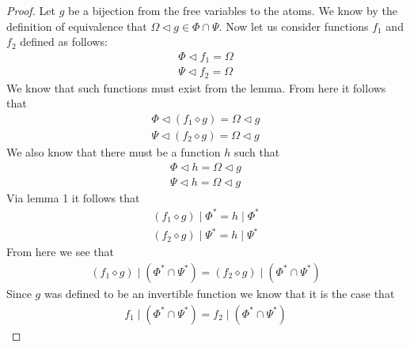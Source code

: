 \documentclass{article}
\begin{document}
\begin{proof}
Let $g$ be a bijection from the free variables to the atoms.
We know by the definition of equivalence that $\Omega \lhd g \in \Phi \cap \Psi$.
Now let us consider functions $f_1$ and $f_2$ defined as follows:
\begin{align*}
\Phi \lhd f_1 = \Omega \\
\Psi \lhd f_2 = \Omega
\end{align*}
We know that such functions must exist from the lemma.
From here it follows that
\begin{align*}
\Phi \lhd (f_1 \diamond g) = \Omega \lhd g \\
\Psi \lhd (f_2 \diamond g) = \Omega \lhd g
\end{align*}
We also know that there must be a function $h$ such that
\begin{align*}
\Phi \lhd h = \Omega \lhd g \\
\Psi \lhd h = \Omega \lhd g
\end{align*}
Via lemma 1 it follows that
\begin{align*}
(f_1 \diamond g) \mid \Phi^* = h \mid \Phi^* \\
(f_2 \diamond g) \mid \Psi^* = h \mid \Psi^*
\end{align*}
From here we see that
\begin{align*}
(f_1 \diamond g) \mid (\Phi^* \cap \Psi^*) = (f_2 \diamond g) \mid (\Phi^* \cap \Psi^*)
\end{align*}
Since $g$ was defined to be an invertible function we know that it is the case that
\begin{align*}
f_1 \mid (\Phi^* \cap \Psi^*) = f_2 \mid (\Phi^* \cap \Psi^*)
\end{align*}
\end{proof}
\end{document}
